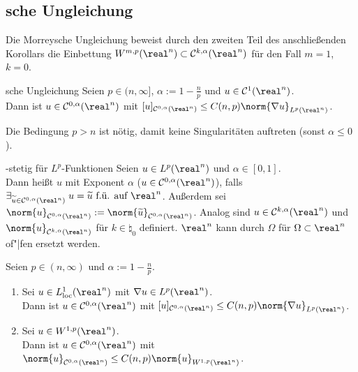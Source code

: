 \pagebreak

\subsection{%
    sche Ungleichung%
}

\begin{Bem}
    Die Morreysche Ungleichung beweist durch den zweiten Teil des anschließenden Korollars
    die Einbettung $W^{m,p}(\real^n) \subset \C^{k,\alpha}(\real^n)$ für den Fall
    $m = 1$, $k = 0$.
\end{Bem}

\begin{Satz}{sche Ungleichung}
    Seien $p \in (n, \infty]$, $\alpha := 1 - \frac{n}{p}$ und $u \in \C^1(\real^n)$.\\
    Dann ist $u \in \C^{0,\alpha}(\real^n)$ mit
    $[u]_{\C^{0,\alpha}(\real^n)} \le C(n,p) \norm{\nabla u}_{L^p(\real^n)}$.
\end{Satz}

\begin{Bem}
    Die Bedingung $p > n$ ist nötig, damit keine Singularitäten auftreten
    (sonst $\alpha \le 0$).
\end{Bem}

\linie

\begin{Def}{-stetig für $L^p$-Funktionen}
    Seien $u \in L^p(\real^n)$ und $\alpha \in [0, 1]$.\\
    Dann heißt $u$  mit Exponent $\alpha$
    ($u \in \C^{0,\alpha}(\real^n)$), falls
    $\exists_{\widetilde{u} \in \C^{0,\alpha}(\real^n)}\;
    u = \widetilde{u} \text{ f.ü. auf } \real^n$.
    Außerdem sei $\norm{u}_{\C^{0,\alpha}(\real^n)} :=
    \norm{\widetilde{u}}_{\C^{0,\alpha}(\real^n)}$.
    Analog sind $u \in \C^{k,\alpha}(\real^n)$ und $\norm{u}_{\C^{k,\alpha}(\real^n)}$
    für $k \in \natural_0$ definiert.
    $\real^n$ kann durch $\Omega$ für $\Omega \subset \real^n$ of"|fen ersetzt werden.
\end{Def}

\begin{Kor}
    Seien $p \in (n, \infty)$ und $\alpha := 1 - \frac{n}{p}$.
    \begin{enumerate}
        \item
        Sei $u \in L^1_\loc(\real^n)$ mit $\nabla u \in L^p(\real^n)$.\\
        Dann ist $u \in \C^{0,\alpha}(\real^n)$ mit
        $[u]_{\C^{0,\alpha}(\real^n)} \le C(n,p) \norm{\nabla u}_{L^p(\real^n)}$.
        
        \item
        Sei $u \in W^{1,p}(\real^n)$.\\
        Dann ist $u \in \C^{0,\alpha}(\real^n)$ mit
        $\norm{u}_{\C^{0,\alpha}(\real^n)} \le C(n,p) \norm{u}_{W^{1,p}(\real^n)}$.
    \end{enumerate}
\end{Kor}

